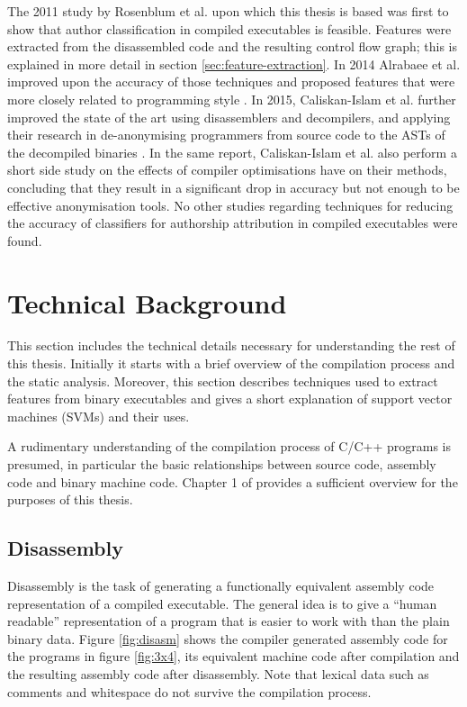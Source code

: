 \documentclass[a4paper,11pt]{kth-mag}
\begin{document}
The 2011 study by Rosenblum et al. \parencite{rosenblum2011wrote} upon which this
thesis is based was first to show that author classification in compiled
executables is feasible. Features were extracted from the disassembled code and
the resulting control flow graph; this is explained in more detail in section
\ref{sec:feature-extraction}. In 2014 Alrabaee et al. improved upon the
accuracy of those techniques and proposed features that were more closely
related to programming style \parencite{alrabaee2014oba2}. In 2015,
Caliskan-Islam et al. further improved the state of the art using disassemblers
and decompilers, and applying their research in de-anonymising programmers from
source code to the ASTs of the decompiled binaries
\parencite{caliskan2015coding}. In the same report, Caliskan-Islam et al. also
perform a short side study on the effects of compiler optimisations have on
their methods, concluding that they result in a significant drop in accuracy
but not enough to be effective anonymisation tools. No other studies regarding
techniques for reducing the accuracy of classifiers for authorship attribution
in compiled executables were found.

\section{Technical Background}
This section includes the technical details necessary for understanding the
rest of this thesis. Initially it starts with a brief overview of the
compilation process and the static analysis. Moreover, this section describes
techniques used to extract features from binary executables and gives a short
explanation of support vector machines (SVMs) and their uses. 

A rudimentary understanding of the compilation process of C/C++ programs is
presumed, in particular the basic relationships between source code, assembly
code and binary machine code. Chapter 1 of \parencite{aho1986compilers}
provides a sufficient overview for the purposes of this thesis.

\subsection{Disassembly}
Disassembly is the task of generating a functionally equivalent assembly code
representation of a compiled executable. The general idea is to give a ``human
readable'' representation of a program that is easier to work with than the plain
binary data. Figure \ref{fig:disasm} shows the compiler generated assembly code
for the programs in figure \ref{fig:3x4}, its equivalent machine code after
compilation and the resulting assembly code after disassembly. Note that
lexical data such as comments and whitespace do not survive the compilation
process.
\end{document}

